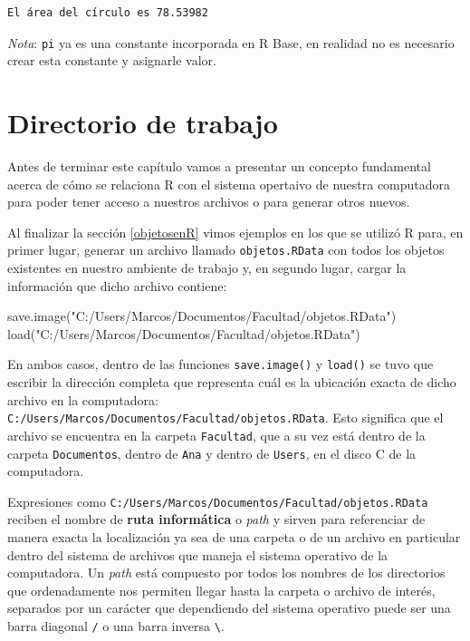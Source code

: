 \documentclass[
]{book}
\newenvironment{Shaded}{\begin{snugshade}}{\end{snugshade}}
\newcommand{\FunctionTok}[1]{\textcolor[rgb]{0.00,0.00,0.00}{#1}}
\newcommand{\NormalTok}[1]{#1}
\newcommand{\StringTok}[1]{\textcolor[rgb]{0.31,0.60,0.02}{#1}}
\begin{document}
\begin{verbatim}
El área del círculo es 78.53982
\end{verbatim}

\emph{Nota}: \texttt{pi} ya es una constante incorporada en R Base, en realidad no es necesario crear esta constante y asignarle valor.

\hypertarget{directorio-de-trabajo}{%
\section{Directorio de trabajo}\label{directorio-de-trabajo}}

Antes de terminar este capítulo vamos a presentar un concepto fundamental acerca de cómo se relaciona R con el sistema opertaivo de nuestra computadora para poder tener acceso a nuestros archivos o para generar otros nuevos.

Al finalizar la sección \ref{objetosenR} vimos ejemplos en los que se utilizó R para, en primer lugar, generar un archivo llamado \texttt{objetos.RData} con todos los objetos existentes en nuestro ambiente de trabajo y, en segundo lugar, cargar la información que dicho archivo contiene:

\begin{Shaded}
\begin{Highlighting}[]
\FunctionTok{save.image}\NormalTok{(}\StringTok{"C:/Users/Marcos/Documentos/Facultad/objetos.RData"}\NormalTok{)}
\FunctionTok{load}\NormalTok{(}\StringTok{"C:/Users/Marcos/Documentos/Facultad/objetos.RData"}\NormalTok{)}
\end{Highlighting}
\end{Shaded}

En ambos casos, dentro de las funciones \texttt{save.image()} y \texttt{load()} se tuvo que escribir la dirección completa que representa cuál es la ubicación exacta de dicho archivo en la computadora: \texttt{C:/Users/Marcos/Documentos/Facultad/objetos.RData}. Esto significa que el archivo se encuentra en la carpeta \texttt{Facultad}, que a su vez está dentro de la carpeta \texttt{Documentos}, dentro de \texttt{Ana} y dentro de \texttt{Users}, en el disco C de la computadora.

Expresiones como \texttt{C:/Users/Marcos/Documentos/Facultad/objetos.RData} reciben el nombre de \textbf{ruta informática} o \emph{path} y sirven para referenciar de manera exacta la localización ya sea de una carpeta o de un archivo en particular dentro del sistema de archivos que maneja el sistema operativo de la computadora. Un \emph{path} está compuesto por todos los nombres de los directorios que ordenadamente nos permiten llegar hasta la carpeta o archivo de interés, separados por un carácter que dependiendo del sistema operativo puede ser una barra diagonal \texttt{/} o una barra inversa \texttt{\textbackslash{}}.
\end{document}

